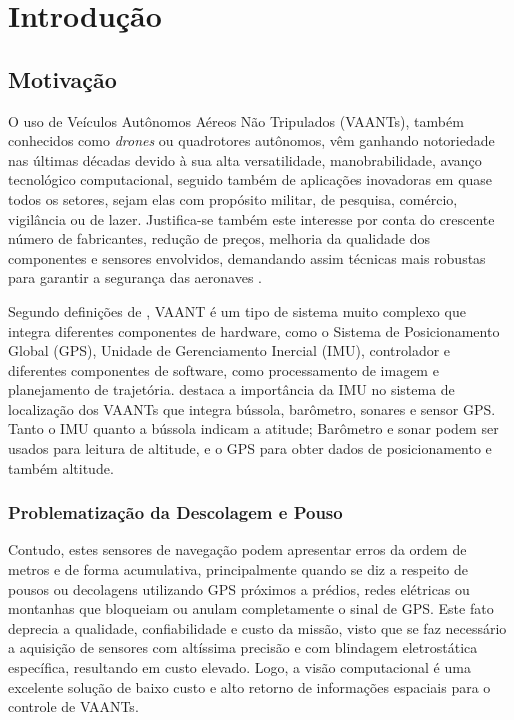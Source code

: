 \chapter{Introdução}

\section{Motivação}

O uso de Veículos Autônomos Aéreos Não Tripulados (VAANTs), também conhecidos como \textit{drones} ou quadrotores autônomos, vêm ganhando notoriedade nas últimas décadas devido à sua alta versatilidade, manobrabilidade, avanço tecnológico computacional, seguido também de aplicações inovadoras em quase todos os setores, sejam elas com propósito militar, de pesquisa, comércio, vigilância ou de lazer. Justifica-se também este interesse por conta do crescente número de fabricantes, redução de preços, melhoria da qualidade dos componentes e sensores envolvidos, demandando assim técnicas mais robustas para garantir a segurança das aeronaves \cite{Santos2014}.

Segundo definições de \citet{Duan2010}, VAANT é um tipo de sistema muito complexo que integra diferentes componentes de hardware, como o Sistema de Posicionamento Global (GPS), Unidade de Gerenciamento Inercial (IMU), controlador e diferentes componentes de software, como processamento de imagem e planejamento de trajetória. \citet{Costa2012} destaca a importância da IMU no sistema de localização dos VAANTs que integra bússola, barômetro, sonares e sensor GPS. Tanto o IMU quanto a bússola indicam a atitude; Barômetro e sonar podem ser usados para leitura de altitude, e o GPS para obter dados de posicionamento e também altitude. 

\subsection{Problematização da Descolagem e Pouso}

Contudo, estes sensores de navegação podem apresentar erros da ordem de metros e de forma acumulativa, principalmente quando se diz a respeito de pousos ou decolagens utilizando GPS próximos a prédios, redes elétricas ou montanhas que bloqueiam ou anulam completamente o sinal de GPS. Este fato deprecia a qualidade, confiabilidade e custo da missão, visto que se faz necessário a aquisição de sensores com altíssima precisão e com blindagem eletrostática específica, resultando em custo elevado. Logo, a visão computacional é uma excelente solução de baixo custo e alto retorno de informações espaciais para o controle de VAANTs.
 
